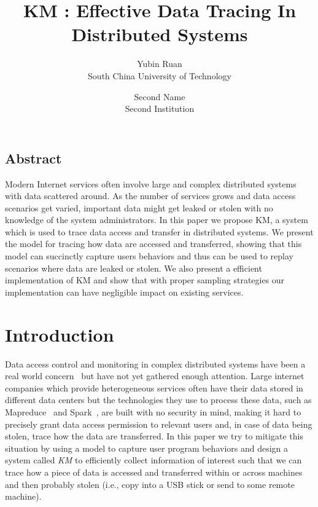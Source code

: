 \documentclass[letterpaper,twocolumn,10pt]{article}
\begin{document}
\date{}

\title{\Large \bf KM : Effective Data Tracing In Distributed Systems}

\author{
{\rm Yubin Ruan}\\
South China University of Technology\\
\and
{\rm Second Name}\\
Second Institution
} %

\maketitle

\thispagestyle{empty}


\subsection*{Abstract}
Modern Internet services often involve large and complex distributed systems
with data scattered around. As the number of services grows and data access
scenarios get varied, important data might get leaked or stolen with no
knowledge of the system administrators. In this paper we propose KM, a system
which is used to trace data access and transfer in distributed systems. We
present the model for tracing how data are accessed and transferred, showing
that this model can succinctly capture users behaviors and thus can be used
to replay scenarios where data are leaked or stolen. We also present a
efficient implementation of KM and show that with proper sampling strategies
our implementation can have negligible impact on existing services. 

\section{Introduction}
Data access control and monitoring in complex distributed systems have been a
real world concern~\cite{cloudComputing:2010} but have not yet gathered enough
attention. Large internet companies which provide heterogeneous services
often have their data stored in different data centers but the technologies
they use to process these data, such as Mapreduce~\cite{MapReduce:2008} and
Spark~\cite{Spark:2015}, are built with no security in mind, making it hard to
precisely grant data access permission to relevant users and, in case of data
being stolen, trace how the data are transferred. In this paper we try to
mitigate this situation by using a model to capture user program behaviors
and design a system called \textit{KM} to efficiently collect information of
interest such that we can trace how a piece of data is accessed and
transferred within or across machines and then probably stolen (i.e., copy
into a USB stick or send to some remote machine). 
\end{document}

